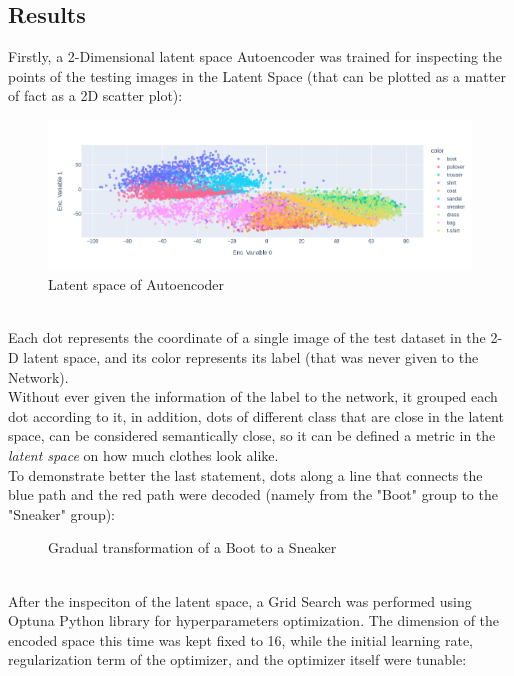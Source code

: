 \documentclass[11pt,a4paper,twocolumn]{IEEEtran}
\begin{document}
		\subsection{\textbf{Results}}
		Firstly, a 2-Dimensional latent space Autoencoder was trained for inspecting the points of the testing images in the Latent Space (that can be plotted as a matter of fact as a 2D scatter plot):\vspace*{-.5cm}
		\begin{figure}[h]
			\centering
			\hspace*{-1.3cm}\includegraphics[width=1.2\linewidth]{../imgs/newplot}
			\caption{Latent space of Autoencoder}
			\label{fig:2dlatent}
		\end{figure}\\
		Each dot represents the coordinate of a single image of the test dataset in the 2-D latent space, and its color represents its label (that was never given to the Network).\\
		Without ever given the information of the label to the network, it grouped each dot according to it, in addition, dots of different class that are close in the latent space, can be considered semantically close, so it can be defined a metric in the \textit{latent space} on how much clothes look alike.\\
		To demonstrate better the last statement, dots along a line that connects the blue path and the red path were decoded (namely from the "Boot" group to the "Sneaker" group):\vspace*{-.5cm}
		\begin{figure}[h]
			\centering
			
			\vspace*{-1cm} %
			\caption{Gradual transformation of a Boot to a Sneaker}
			\label{fig:trasf}
		\end{figure}\medskip\\
		After the inspeciton of the latent space, a Grid Search was performed using Optuna Python library for hyperparameters optimization. The dimension of the encoded space this time was kept fixed to 16, while the initial learning rate, regularization term of the optimizer, and the optimizer itself were tunable:
\end{document}
